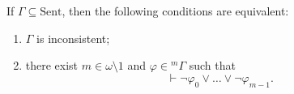 If $\Gamma \subseteq \text{Sent}$, then the following conditions are equivalent:
\begin{enumerate}
\item[(i)] $\Gamma$ is inconsistent;
\item[(ii)] there exist $m \in \omega \setminus 1$ and $\varphi \in {}^m\Gamma$ such that
  $$\vdash \neg\varphi_0 \lor \dots \lor \neg\varphi_{m-1}.$$
\end{enumerate}

